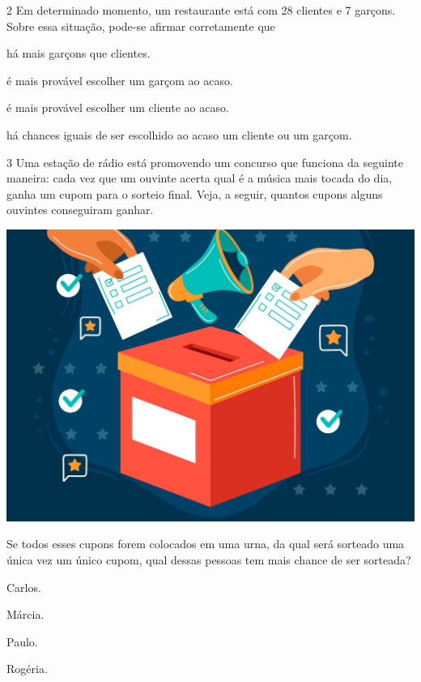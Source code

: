 \num{2} Em determinado momento, um restaurante está com 28 clientes e 7
garçons. Sobre essa situação, pode-se afirmar corretamente que

\begin{escolha}
\item
  há mais garçons que clientes.
\item
  é mais provável escolher um garçom ao acaso.
\item
  é mais provável escolher um cliente ao acaso.
\item
  há chances iguais de ser escolhido ao acaso um cliente ou um garçom.
\end{escolha}


\num{3} Uma estação de rádio está promovendo um concurso que funciona da seguinte maneira: cada vez que um ouvinte acerta qual é a música mais tocada do dia, ganha um cupom para o sorteio final. Veja, a seguir, quantos cupons alguns ouvintes conseguiram ganhar.


\begin{center}
\includegraphics[width=.6\textwidth]{media/image37i.jpeg}
\end{center}

Se todos esses cupons forem colocados em uma urna, da qual será sorteado uma única vez um único cupom, qual dessas pessoas tem mais chance de ser sorteada?

\begin{multicols}{2}
\begin{escolha}
\item
  Carlos.
\item
  Márcia.
\item
  Paulo.
\item
  Rogéria.
\end{escolha}
\end{multicols}

